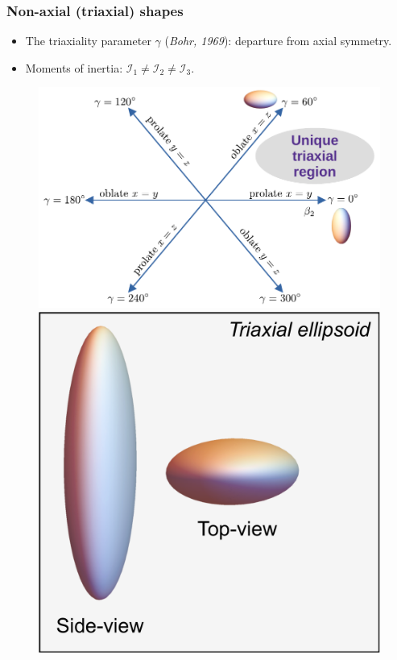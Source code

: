 \documentclass{beamer}
\begin{document}
\begin{frame}
	\frametitle{Non-axial (triaxial) shapes}
	\vspace{-0.2cm}
	\begin{itemize}
		\item The triaxiality parameter $\gamma$ (\textit{Bohr, 1969}): departure from axial symmetry.
		\item Moments of inertia: $\mathcal{I}_{1}\neq\mathcal{I}_{2}\neq\mathcal{I}_{3}$.
	\end{itemize}
	\vspace{-0.2cm}
	\begin{figure}
		\centering
		\includegraphics[scale=0.49]{figures/nice_diagram.pdf}
		\includegraphics[scale=0.20]{figures/triaxial-shape.pdf}
		\vspace{-0.41cm}
	\end{figure}
\end{frame}
\end{document}
